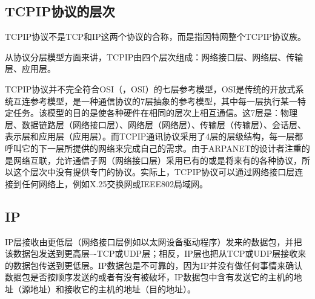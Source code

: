 \subsection{\acrshort{TCPIP}协议的层次}
\acrshort{TCPIP}协{\cf}议不{\cf}是T{\cf}CP{\cf}和I{\cf}P这{\cf}两个{\cf}协议{\cf}的合{\cf}称，{\cf}而是{\cf}指因{\cf}特网整个\acrshort{TCPIP}协议族。

从{\cf}协议{\cf}分层{\cf}模型{\cf}方面{\cf}来讲{\cf}，\acrshort{TCPIP}由{\cf}四个{\cf}层次{\cf}组成{\cf}：网{\cf}络接{\cf}口层{\cf}、网{\cf}络层{\cf}、传{\cf}输层{\cf}、应{\cf}用层。

\acrshort{TCPIP}协{\cf}议并{\cf}不完{\cf}全符{\cf}合OSI（，\acrlong{OSI}）的{\cf}七层{\cf}参考{\cf}模型{\cf}，\acrshort{OSI}是{\cf}传统{\cf}的开{\cf}放式{\cf}系统{\cf}互连{\cf}参考{\cf}模型{\cf}，是{\cf}一种{\cf}通信{\cf}协议{\cf}的7{\cf}层抽{\cf}象的{\cf}参考{\cf}模型{\cf}，其{\cf}中每{\cf}一层{\cf}执行{\cf}某一{\cf}特定{\cf}任务{\cf}。该{\cf}模型{\cf}的目{\cf}的是{\cf}使各{\cf}种硬{\cf}件在{\cf}相同{\cf}的层{\cf}次上{\cf}相互{\cf}通信{\cf}。这{\cf}7层{\cf}是：{\cf}物理{\cf}层、{\cf}数据{\cf}链路{\cf}层（{\cf}网络{\cf}接口{\cf}层）{\cf}、网{\cf}络层{\cf}（网{\cf}络层{\cf}）、{\cf}传输{\cf}层（{\cf}传输{\cf}层）{\cf}、会{\cf}话层{\cf}、表{\cf}示层{\cf}和应{\cf}用层{\cf}（应{\cf}用层{\cf}）。而\acrshort{TCPIP}通{\cf}讯协{\cf}议采{\cf}用了{\cf}4层{\cf}的层{\cf}级结{\cf}构，{\cf}每一{\cf}层都{\cf}呼叫{\cf}它的{\cf}下一{\cf}层所{\cf}提供{\cf}的网{\cf}络来{\cf}完成{\cf}自己{\cf}的需{\cf}求。{\cf}由于{\cf}AR{\cf}PA{\cf}NE{\cf}T的{\cf}设计{\cf}者注{\cf}重的{\cf}是网{\cf}络互{\cf}联，{\cf}允许{\cf}通信{\cf}子网{\cf}（网{\cf}络接{\cf}口层{\cf}）采{\cf}用已{\cf}有的{\cf}或是{\cf}将来{\cf}有的{\cf}各种{\cf}协议{\cf}，所{\cf}以这{\cf}个层{\cf}次中{\cf}没有{\cf}提供{\cf}专门{\cf}的协{\cf}议。{\cf}实际{\cf}上，\acrshort{TCPIP}协{\cf}议可{\cf}以通{\cf}过网{\cf}络接{\cf}口层{\cf}连接{\cf}到任{\cf}何网{\cf}络上{\cf}，例{\cf}如X{\cf}.2{\cf}5交{\cf}换网{\cf}或I{\cf}EE{\cf}E8{\cf}02局域网。

\subsection{IP}
IP{\cf}层接{\cf}收由{\cf}更低{\cf}层（{\cf}网络{\cf}接口{\cf}层例{\cf}如以{\cf}太网{\cf}设备{\cf}驱动{\cf}程序{\cf}）发{\cf}来的{\cf}数据{\cf}包，{\cf}并把{\cf}该数{\cf}据包{\cf}发送{\cf}到更{\cf}高层{\cf}--{\cf}-T{\cf}CP{\cf}或U{\cf}DP{\cf}层；{\cf}相反{\cf}，I{\cf}P层{\cf}也把{\cf}从T{\cf}CP{\cf}或U{\cf}DP{\cf}层接{\cf}收来{\cf}的数{\cf}据包{\cf}传送{\cf}到更{\cf}低层{\cf}。I{\cf}P数{\cf}据包{\cf}是不{\cf}可靠{\cf}的，{\cf}因为{\cf}IP{\cf}并没{\cf}有做{\cf}任何{\cf}事情{\cf}来确{\cf}认数{\cf}据包{\cf}是否{\cf}按顺{\cf}序发{\cf}送的{\cf}或者{\cf}有没{\cf}有被{\cf}破坏{\cf}，I{\cf}P数{\cf}据包{\cf}中含{\cf}有发{\cf}送它{\cf}的主{\cf}机的{\cf}地址{\cf}（源{\cf}地址{\cf}）和{\cf}接收{\cf}它的{\cf}主机{\cf}的地{\cf}址（{\cf}目的{\cf}地址{\cf}）。

